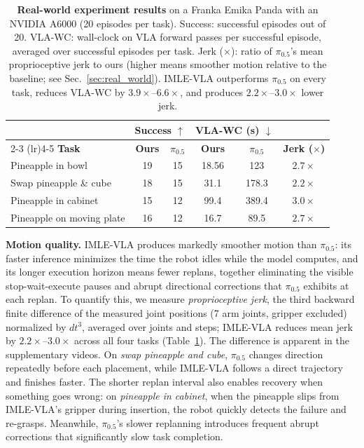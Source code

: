 \documentclass[letterpaper, 10 pt, conference]{ieeeconf}  %
\begin{document}
\begin{table}[t]
    \centering
    \footnotesize
    \setlength{\tabcolsep}{2.8pt}
    \vspace{0.9em}
    \begin{tabular}{@{}l cc cc c@{}}
        \toprule
        & \multicolumn{2}{c}{\textbf{Success} $\uparrow$} & \multicolumn{2}{c}{\textbf{VLA-WC (s)} $\downarrow$} & \\
        \cmidrule(lr){2-3} \cmidrule(lr){4-5}
        \textbf{Task} & \textbf{Ours} & \textbf{$\pi_{0.5}$} & \textbf{Ours} & \textbf{$\pi_{0.5}$} & \textbf{Jerk ($\times$)} \\
        \midrule
        Pineapple in bowl         & 19 & 15 & 18.56 & 123 & $2.7\times$ \\
        Swap pineapple \& cube    & 18  & 15 & 31.1  & 178.3  & $2.2\times$ \\
        Pineapple in cabinet      & 15  & 12 & 99.4  & 389.4  & $3.0\times$ \\
        Pineapple on moving plate & 16  & 12 & 16.7  & 89.5   & $2.7\times$ \\
        \bottomrule
    \end{tabular}
    \vspace{0.3em}
    \caption{\textbf{Real-world experiment results} on a Franka Emika Panda with an NVIDIA A6000 (20 episodes per task). Success: successful episodes out of 20. VLA-WC: wall-clock on VLA forward passes per successful episode, averaged over successful episodes per task. Jerk ($\times$): ratio of $\pi_{0.5}$'s mean proprioceptive jerk to ours (higher means smoother motion relative to the baseline; see Sec.~\ref{sec:real_world}). IMLE-VLA outperforms $\pi_{0.5}$ on every task, reduces VLA-WC by $3.9\times$--$6.6\times$, and produces $2.2\times$--$3.0\times$ lower jerk.} 
    \label{tab:realrobot_static}
\end{table}

\textbf{Motion quality.} IMLE-VLA produces markedly smoother motion than $\pi_{0.5}$: its faster inference minimizes the time the robot idles while the model computes, and its longer execution horizon means fewer replans, together eliminating the visible stop-wait-execute pauses and abrupt directional corrections that $\pi_{0.5}$ exhibits at each replan. To quantify this, we measure \emph{proprioceptive jerk}, the third backward finite difference of the measured joint positions (7 arm joints, gripper excluded) normalized by $dt^{3}$, averaged over joints and steps; IMLE-VLA reduces mean jerk by $2.2\times$--$3.0\times$ across all four tasks (Table~\ref{tab:realrobot_static}). The difference is apparent in the supplementary videos. On \emph{swap pineapple and cube}, $\pi_{0.5}$ changes direction repeatedly before each placement, while IMLE-VLA follows a direct trajectory and finishes faster. The shorter replan interval also enables recovery when something goes wrong: on \emph{pineapple in cabinet}, when the pineapple slips from IMLE-VLA's gripper during insertion, the robot quickly detects the failure and re-grasps. Meanwhile, $\pi_{0.5}$'s slower replanning introduces frequent abrupt corrections that significantly slow task completion.
\end{document}
